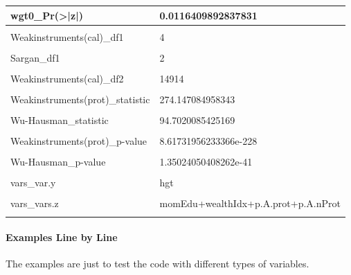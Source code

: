 \documentclass[
]{book}
\begin{document}
\begin{table}[!h]
\begin{tabular}{l|l}
\hline
wgt0\_Pr(>|z|) & 0.0116409892837831\\
\hline
\cellcolor{gray!6}{Weakinstruments(prot)\_df1} & \cellcolor{gray!6}{4}\\
\hline
Weakinstruments(cal)\_df1 & 4\\
\hline
\cellcolor{gray!6}{Wu-Hausman\_df1} & \cellcolor{gray!6}{2}\\
\hline
Sargan\_df1 & 2\\
\hline
\cellcolor{gray!6}{Weakinstruments(prot)\_df2} & \cellcolor{gray!6}{14914}\\
\hline
Weakinstruments(cal)\_df2 & 14914\\
\hline
\cellcolor{gray!6}{Wu-Hausman\_df2} & \cellcolor{gray!6}{14914}\\
\hline
Weakinstruments(prot)\_statistic & 274.147084958343\\
\hline
\cellcolor{gray!6}{Weakinstruments(cal)\_statistic} & \cellcolor{gray!6}{315.036848606231}\\
\hline
Wu-Hausman\_statistic & 94.7020085425169\\
\hline
\cellcolor{gray!6}{Sargan\_statistic} & \cellcolor{gray!6}{122.081979628898}\\
\hline
Weakinstruments(prot)\_p-value & 8.61731956233366e-228\\
\hline
\cellcolor{gray!6}{Weakinstruments(cal)\_p-value} & \cellcolor{gray!6}{1.18918641220866e-260}\\
\hline
Wu-Hausman\_p-value & 1.35024050408262e-41\\
\hline
\cellcolor{gray!6}{Sargan\_p-value} & \cellcolor{gray!6}{3.09196773720398e-27}\\
\hline
vars\_var.y & hgt\\
\hline
\cellcolor{gray!6}{vars\_vars.x} & \cellcolor{gray!6}{prot+cal}\\
\hline
vars\_vars.z & momEdu+wealthIdx+p.A.prot+p.A.nProt\\
\hline
\cellcolor{gray!6}{vars\_vars.c} & \cellcolor{gray!6}{sex+hgt0+wgt0}\\
\hline
\end{tabular}
\end{table}

\hypertarget{examples-line-by-line}{%
\paragraph{Examples Line by Line}\label{examples-line-by-line}}

The examples are just to test the code with different types of variables.
\end{document}
